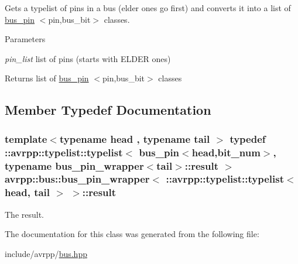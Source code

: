 Gets a typelist of pins in a bus (elder ones go first) and converts it into a list of \hyperlink{structavrpp_1_1bus_1_1bus__pin}{bus\_\-pin} $<$pin,bus\_\-bit$>$ classes. 
\begin{DoxyParams}{Parameters}
\item[{\em pin\_\-list}]list of pins (starts with ELDER ones) \end{DoxyParams}
\begin{DoxyReturn}{Returns}
list of \hyperlink{structavrpp_1_1bus_1_1bus__pin}{bus\_\-pin} $<$pin,bus\_\-bit$>$ classes 
\end{DoxyReturn}


\subsection{Member Typedef Documentation}
\hypertarget{classavrpp_1_1bus_1_1bus__pin__wrapper_3_01_1_1avrpp_1_1typelist_1_1typelist_3_01head_00_01tail_01_4_01_4_a58fd508a2ebc3444706ee577b20e2d38}{
\subsubsection[{result}]{\setlength{\rightskip}{0pt plus 5cm}template$<$typename head , typename tail $>$ typedef ::{\bf avrpp::typelist::typelist}$<$ {\bf bus\_\-pin}$<$head,bit\_\-num$>$, typename bus\_\-pin\_\-wrapper$<$tail$>$::{\bf result} $>$ avrpp::bus::bus\_\-pin\_\-wrapper$<$ ::{\bf avrpp::typelist::typelist}$<$ head, tail $>$ $>$::{\bf result}}}
\label{classavrpp_1_1bus_1_1bus__pin__wrapper_3_01_1_1avrpp_1_1typelist_1_1typelist_3_01head_00_01tail_01_4_01_4_a58fd508a2ebc3444706ee577b20e2d38}


The result. 



The documentation for this class was generated from the following file:\begin{DoxyCompactItemize}
\item 
include/avrpp/\hyperlink{bus_8hpp}{bus.hpp}\end{DoxyCompactItemize}
